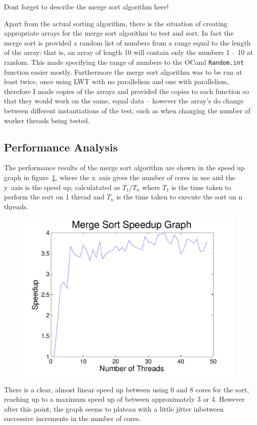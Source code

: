\documentclass[12pt,twoside,notitlepage]{report}
\begin{document}
Dont forget to describe the merge sort algorithm here!

Apart from the actual sorting algorithm, there is the situation of creating appropriate arrays for the merge sort algorithm to test and sort. In fact the merge sort is provided a random list of numbers from a range equal to the length
of the array: that is, an array of length 10 will contain only the numbers 1 -- 10 at random. This made specifying the range of numbers to the OCaml {\tt Random.int} function easier mostly. Furthermore the merge sort algorithm was to
be run at least twice, once using LWT with no parallelism and one with parallelism, therefore I made copies of the arrays and provided the copies to each function so that they would work on the same, equal data -- however the array's
do change between different instantiations of the test, such as when changing the number of worker threads being tested.


\subsection{Performance Analysis}
\label{subsec:merge_sort_performance_analysis}
The performance results of the merge sort algorithm are shown in the speed up graph in figure~\ref{fig:msort_speedup_graph}, where the x~axis gives the number of cores in use and the y~axis is the speed up, calculatated as
$T_1 / T_n$ where $T_1$ is the time taken to perform the sort on 1 thread and $T_n$ is the time taken to execute the sort on n threads.
\begin{figure}[h!]
\includegraphics[width=\linewidth]{msort_speedup_graph}
\caption{}
\label{fig:msort_speedup_graph}
\end{figure}
There is a clear, almost linear speed up between using 0 and 8 cores for the sort, reaching up to
a maximum speed up of between approximately 3 or 4. However after this point, the graph seems to plateau with a little jitter inbetween successive increments in the number of cores.
\end{document}
